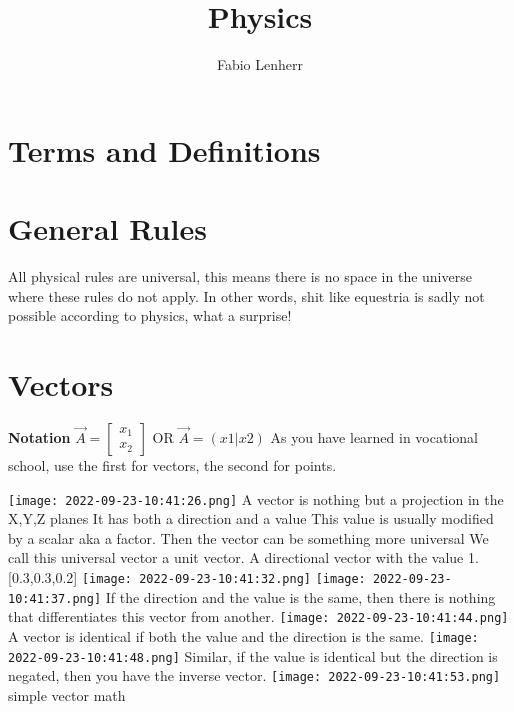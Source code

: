 \documentclass[main.tex,fontsize=8pt,paper=a4,paper=portrait,DIV=calc,]{scrartcl}
\title{Physics}
\author{Fabio Lenherr}
\begin{document}
\tableofcontents

\section{Terms and Definitions}

\begin{multicols*}{2}

\section{General Rules}
All physical rules are universal, this means there is no space in the universe where these rules do not apply.\newline
In other words, shit like equestria is sadly not possible according to physics, what a surprise!

\section{Vectors}
\textbf{Notation} \( \vec{A} = \begin{bmatrix}x_{1} \\ x_{2} \end{bmatrix} \) OR \(\vec{A} = (x1 | x2)\)\newline
As you have learned in vocational school, use the first for vectors, the second for points.\newline

\texttt{[image: 2022-09-23-10:41:26.png]}
{A vector is nothing but a projection in the X,Y,Z planes \newline 
It has both a direction and a value \newline
This value is usually modified by a scalar aka a factor. Then the vector can be something more universal \newline
We call this universal vector a unit vector. A directional vector with the value 1.}[0.3,0.3,0.2]\newline
\texttt{[image: 2022-09-23-10:41:32.png]}
\texttt{[image: 2022-09-23-10:41:37.png]}\newline
If the direction and the value is the same, then there is nothing that differentiates this vector from another.\newline
\texttt{[image: 2022-09-23-10:41:44.png]}\newline
A vector is identical if both the value and the direction is the same.\newline
\texttt{[image: 2022-09-23-10:41:48.png]}\newline 
Similar, if the value is identical but the direction is negated, then you have the inverse vector.\newline
\texttt{[image: 2022-09-23-10:41:53.png]}\newline 
simple vector math \newline

\end{multicols*}
\end{document}
